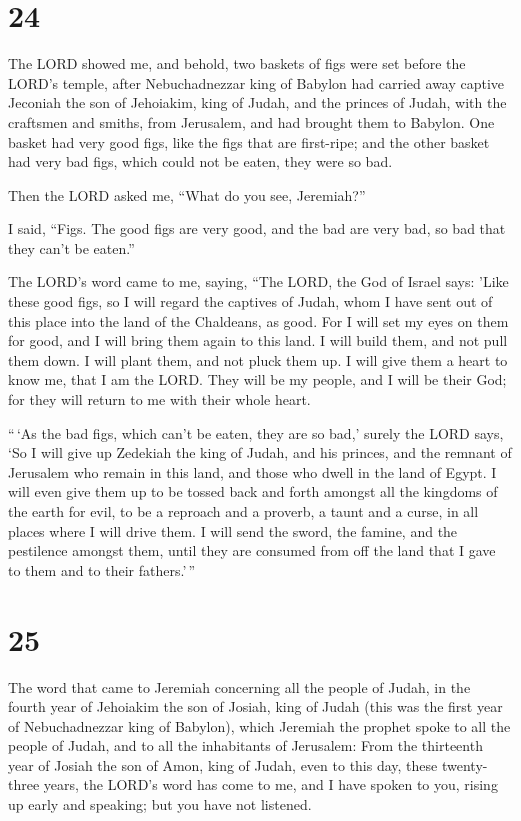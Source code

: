 \hypertarget{section-23}{%
\section{24}\label{section-23}}

 The LORD showed me, and behold, two baskets of figs were
set before the LORD's temple, after Nebuchadnezzar king of Babylon had
carried away captive Jeconiah the son of Jehoiakim, king of Judah, and
the princes of Judah, with the craftsmen and smiths, from Jerusalem, and
had brought them to Babylon.  One basket had very good figs,
like the figs that are first-ripe; and the other basket had very bad
figs, which could not be eaten, they were so bad.

 Then the LORD asked me, ``What do you see, Jeremiah?''

I said, ``Figs. The good figs are very good, and the bad are very bad,
so bad that they can't be eaten.''

 The LORD's word came to me, saying,  ``The
LORD, the God of Israel says: 'Like these good figs, so I will regard
the captives of Judah, whom I have sent out of this place into the land
of the Chaldeans, as good.  For I will set my eyes on them
for good, and I will bring them again to this land. I will build them,
and not pull them down. I will plant them, and not pluck them up.
 I will give them a heart to know me, that I am the LORD.
They will be my people, and I will be their God; for they will return to
me with their whole heart.

 ``\,`As the bad figs, which can't be eaten, they are so
bad,' surely the LORD says, `So I will give up Zedekiah the king of
Judah, and his princes, and the remnant of Jerusalem who remain in this
land, and those who dwell in the land of Egypt.  I will even
give them up to be tossed back and forth amongst all the kingdoms of the
earth for evil, to be a reproach and a proverb, a taunt and a curse, in
all places where I will drive them.  I will send the sword,
the famine, and the pestilence amongst them, until they are consumed
from off the land that I gave to them and to their fathers.'\,''

\hypertarget{section-24}{%
\section{25}\label{section-24}}

 The word that came to Jeremiah concerning all the people of
Judah, in the fourth year of Jehoiakim the son of Josiah, king of Judah
(this was the first year of Nebuchadnezzar king of Babylon),
 which Jeremiah the prophet spoke to all the people of
Judah, and to all the inhabitants of Jerusalem:  From the
thirteenth year of Josiah the son of Amon, king of Judah, even to this
day, these twenty-three years, the LORD's word has come to me, and I
have spoken to you, rising up early and speaking; but you have not
listened.

